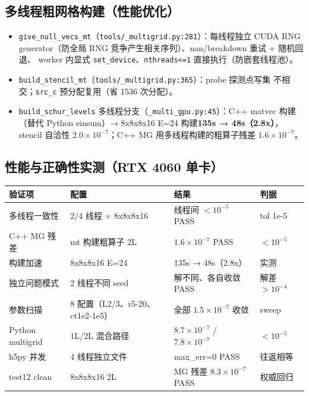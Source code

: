\documentclass[UTF8]{ctexart}
\begin{document}
\subsection{多线程粗网格构建（性能优化）}

\begin{itemize}
  \item \texttt{give\_null\_vecs\_mt}（\texttt{tools/\_multigrid.py:281}）：每线程独立 CUDA
        RNG generator（防全局 RNG 竞争产生相关序列）、nan/breakdown 重试 + 随机回退、
        worker 内显式 \texttt{set\_device}、\texttt{nthreads<=1} 直接执行（防嵌套线程池）。
  \item \texttt{build\_stencil\_mt}（\texttt{tools/\_multigrid.py:365}）：probe 探测点写集
        不相交；\texttt{src\_c} 预分配复用（省 1536 次分配）。
  \item \texttt{build\_schur\_levels} 多线程分支（\texttt{\_multi\_gpu.py:45}）：C++ matvec
        构建（替代 Python einsum）→ 8x8x8x16 E=24 构建\textbf{135s → 48s（2.8x）}，
        stencil 自洽性 $2.0\times10^{-7}$；C++ MG 用多线程构建的粗算子残差 $1.6\times10^{-7}$。
\end{itemize}

\subsection{性能与正确性实测（RTX 4060 单卡）}

\begin{center}
\begin{tabular}{llll}
\toprule
验证项 & 配置 & 结果 & 判据 \\
\midrule
多线程一致性 & 2/4 线程 × 8x8x8x16 & 线程间 $<10^{-5}$ PASS & tol 1e-5 \\
C++ MG 残差 & mt 构建粗算子 2L & $1.6\times10^{-7}$ PASS & $<10^{-5}$ \\
构建加速 & 8x8x8x16 E=24 & 135s → 48s（2.8x） & 实测 \\
独立问题模式 & 2 线程不同 seed & 解不同、各自收敛 PASS & 解差 $>10^{-4}$ \\
参数扫描 & 8 配置（L2/3、r5-20、ct1e2-1e5） & 全部 $1.5\times10^{-7}$ 收敛 & sweep \\
Python multigrid & 1L/2L 混合路径 & $8.7\times10^{-7}$ / $7.8\times10^{-7}$ & $<10^{-5}$ \\
h5py 并发 & 4 线程独立文件 & max\_err=0 PASS & 往返相等 \\
test12 clean & 8x8x8x16 2L & MG 残差 $8.3\times10^{-7}$ PASS & 权威回归 \\
\bottomrule
\end{tabular}
\end{center}
\end{document}
